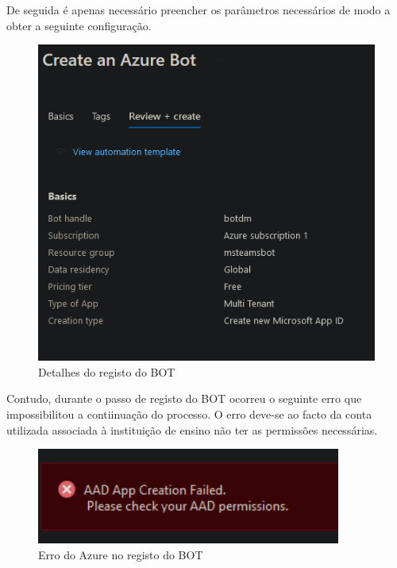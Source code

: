 De seguida é apenas necessário preencher os parâmetros necessários de modo a obter
a seguinte configuração.

\begin{figure}[H]
\begin{center}
\includegraphics[width=14cm]{figs/detalhes do bot.png}
\caption{Detalhes do registo do BOT}
\label{fig:bookstack}
\end{center}
\end{figure}


Contudo, durante o passo de registo do BOT ocorreu o seguinte erro que impossibilitou
a contiinuação do processo. O erro deve-se ao facto da conta utilizada associada à 
instituição de ensino não ter as permissões necessárias.

\begin{figure}[H]
\begin{center}
\includegraphics[width=10cm]{figs/erro bot azure.png}
\caption{Erro do Azure no registo do BOT}
\label{fig:bookstack}
\end{center}
\end{figure}



